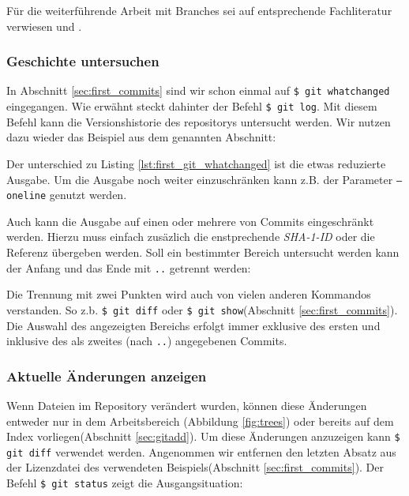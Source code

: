 Für die weiterführende Arbeit mit Branches sei auf entsprechende Fachliteratur
verwiesen \cite[388-389, 408-415]{cd} und \cite[56-88]{progit}.

\subsubsection{Geschichte untersuchen}\label{sec:arch}
In Abschnitt \ref{sec:first_commits} sind wir schon einmal auf \texttt{\$ git
whatchanged} eingegangen.  Wie erwähnt steckt dahinter der Befehl \texttt{\$
git log}. Mit diesem Befehl kann die Versionshistorie des \glspl{repository}
untersucht werden. Wir nutzen dazu wieder das Beispiel aus dem genannten
Abschnitt:



Der unterschied zu Listing \ref{lst:first_git_whatchanged} ist die etwas
reduzierte Ausgabe. Um die Ausgabe noch weiter einzuschränken kann z.B. der
Parameter \texttt{--oneline} genutzt werden.



Auch kann die Ausgabe auf einen oder mehrere von Commits eingeschränkt werden.
Hierzu muss einfach zusäzlich die enstprechende \textit{SHA-1-ID} oder die
Referenz übergeben werden. Soll ein bestimmter Bereich untersucht werden kann
der Anfang und das Ende mit \texttt{..} getrennt werden:



Die Trennung mit zwei Punkten wird auch von vielen anderen Kommandos
verstanden. So z.b. \texttt{\$ git diff} oder \texttt{\$ git show}(Abschnitt
\ref{sec:first_commits}). Die Auswahl des angezeigten Bereichs erfolgt immer
exklusive des ersten und inklusive des als zweites (nach \texttt{..}) angegebenen
Commits.\cite[45-48]{gitosp}

\subsubsection{Aktuelle Änderungen anzeigen}\label{sec:gitdiff}
Wenn Dateien im Repository verändert wurden, können diese Änderungen entweder
nur in dem Arbeitsbereich (Abbildung \ref{fig:trees}) oder bereits auf dem
Index vorliegen(Abschnitt \ref{sec:gitadd}). Um diese Änderungen anzuzeigen
kann \texttt{\$ git diff} verwendet werden. Angenommen wir entfernen den
letzten Absatz aus der Lizenzdatei des verwendeten Beispiels(Abschnitt
\ref{sec:first_commits}). Der Befehl \texttt{\$ git status} zeigt die
Ausgangsituation:

